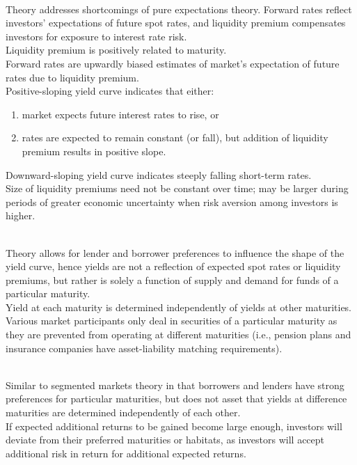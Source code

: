 \begin{remark} \\
Theory addresses shortcomings of pure expectations theory. Forward rates reflect investors' expectations of future spot rates, and liquidity premium compensates investors for exposure to interest rate risk.\\
Liquidity premium is positively related to maturity.\\
Forward rates are upwardly biased estimates of market's expectation of future rates due to liquidity premium.\\
Positive-sloping yield curve indicates that either:
\begin{enumerate}[label=\roman*.]
\setlength{\itemsep}{0pt}
\item market expects future interest rates to rise, or
\item rates are expected to remain constant (or fall), but addition of liquidity premium results in positive slope.
\end{enumerate}
Downward-sloping yield curve indicates steeply falling short-term rates.\\
Size of liquidity premiums need not be constant over time; may be larger during periods of greater economic uncertainty when risk aversion among investors is higher.
\end{remark}

\begin{remark} \\
Theory allows for lender and borrower preferences to influence the shape of the yield curve, hence yields are not a reflection of expected spot rates or liquidity premiums, but rather is solely a function of supply and demand for funds of a particular maturity.\\
Yield at each maturity is determined independently of yields at other maturities.\\
Various market participants only deal in securities of a particular maturity as they are prevented from operating at different maturities (i.e., pension plans and insurance companies have asset-liability matching requirements).
\end{remark}

\begin{remark} \\
Similar to segmented markets theory in that borrowers and lenders have strong preferences for particular maturities, but does not asset that yields at difference maturities are determined independently of each other.\\
If expected additional returns to be gained become large enough, investors will deviate from their preferred maturities or habitats, as investors will accept additional risk in return for additional expected returns.\\
\end{remark}

